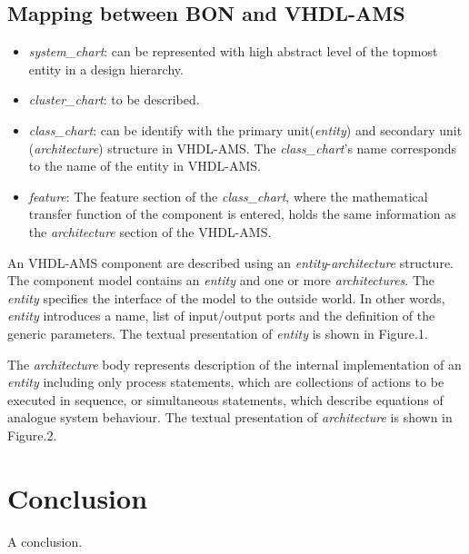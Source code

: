\documentclass{article}
\newcommand{\todo}{\textbf{TODO:}}
\newcommand{\Sc}{\emph{system\_chart}\xspace}
\newcommand{\Clc}{\emph{cluster\_chart}\xspace}
\newcommand{\Csc}{\emph{class\_chart}\xspace}
\newcommand{\Ft}{\emph{feature}\xspace}
\newcommand{\ent}{\emph{entity}\xspace}
\newcommand{\arch}{\emph{architecture}\xspace}
\newcommand{\archs}{\emph{architectures}\xspace}
\begin{document}
\subsection{Mapping between BON and VHDL-AMS}
\begin{itemize}
\item \Sc: can be represented with high abstract level of the topmost 
entity in a design hierarchy.
\item \Clc: to be described.
\item \Csc: can be identify with the primary unit(\ent) and secondary 
unit (\arch) structure in VHDL-AMS.
The \Csc's name corresponds to the name of the entity in VHDL-AMS.
\item \Ft: The feature section of the \Csc, where the mathematical 
transfer function of the component is entered, holds the same information 
as the \arch section of the VHDL-AMS.
\end{itemize}
An VHDL-AMS component are described using an \ent-\arch structure. 
The component model contains an \ent and one or more \archs. 
The \ent specifies the interface of the model to the outside world. 
In other words, \ent introduces a name, list of input/output ports 
and the definition of the generic parameters. The textual 
presentation of \ent is shown in Figure.1. 

 
The \arch body represents description of the internal implementation 
of an \ent including only process statements, which are collections 
of actions to be executed in sequence, or simultaneous statements, 
which describe equations of analogue system behaviour. 
The textual presentation of \arch is shown in Figure.2.

 


\section{Conclusion}

A conclusion.




\end{document}
